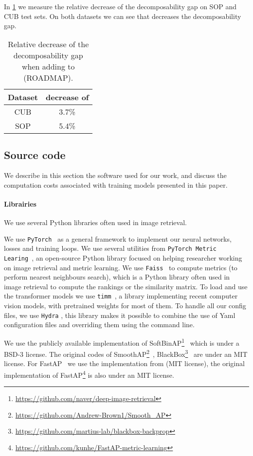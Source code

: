 In \cref{tab:dgap_increase} we measure the relative decrease of the decomposability gap  on SOP and CUB test sets. On both datasets we can see that  decreases the decomposability gap.


\begin{table}[h!]
    \caption{Relative decrease of the decomposability gap when adding  to  (ROADMAP).}
    \label{tab:dgap_increase}
    \centering
    \begin{tabular}{ c c }
        \toprule
         Dataset &  decrease of  \\
         \midrule
         CUB  & 3.7\% \\
         SOP & 5.4\% \\
         \bottomrule
    \end{tabular}
\end{table}


\subsection{Source code}

We describe in this section the software used for our work, and discuss the computation costs associated with training models presented in this paper.

\paragraph{Librairies} We use several Python libraries often used in image retrieval.

We use \texttt{PyTorch}~\cite{pytorch} as a general framework to implement our neural networks, losses and training loops. We use several utilities from \texttt{PyTorch Metric Learing}~\cite{PML}, an open-source Python library focused on helping researcher working on image retrieval and metric learning. We use \texttt{Faiss}~\cite{faiss} to compute metrics (\ie to perform nearest neighbours search), which is a Python library often used in image retrieval to compute the rankings or the similarity matrix. To load and use the transformer models we use \texttt{timm}~\cite{timm}, a library implementing recent computer vision models, with pretrained weights for most of them. To handle all our config files, we use \texttt{Hydra} \cite{hydra}, this library makes it possible to combine the use of Yaml configuration files and overriding them using the command line.

We use the publicly available implementation of SoftBinAP\footnote{\url{https://github.com/naver/deep-image-retrieval}}~\cite{naverap} which is under a BSD-3 license. The original codes of SmoothAP\footnote{\url{https://github.com/Andrew-Brown1/Smooth_AP}}~\cite{smoothap}, BlackBox\footnote{\url{https://github.com/martius-lab/blackbox-backprop}}~\cite{blackbox,blackboxap} are under an MIT license. For FastAP~\cite{fastap} we use the implementation from \cite{PML} (MIT license), the original implementation of FastAP\footnote{\url{https://github.com/kunhe/FastAP-metric-learning}} is also under an MIT license.



